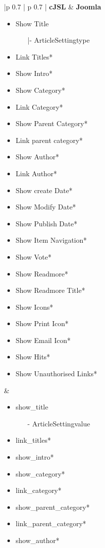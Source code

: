 \begin{minipage}{0.7\textwidth}
\begin{tabular}{|p {0.7\textwidth} | p {0.7\textwidth} |}
\hline
\textbf{cJSL} & \textbf{Joomla} \\ 
\hline
\begin{itemize}
\item Show Title
	\begin{enumerate}
	\item[|-]ArticleSettingtype
	\end{enumerate}
\item Link Titles*
\item Show Intro*
\item Show Category*
\item Link Category*
\item Show Parent Category*
\item Link parent category*
\item Show Author*
\item Link Author*
\item Show create Date*
\item Show Modify Date*
\item Show Publish Date*
\item Show Item Navigation*
\item Show Vote*
\item Show Readmore*
\item Show Readmore Title*
\item Show Icons*
\item Show Print Icon*
\item Show Email Icon*
\item Show Hits*
\item Show Unauthorised Links*
\end{itemize} 
&
\begin{itemize}
\item show\_title
	\begin{enumerate}
     \item[-]ArticleSettingvalue
	\end{enumerate}	
\item link\_titles*
\item show\_intro*
\item show\_category*
\item link\_category*
\item show\_parent\_category*
\item link\_parent\_category*
\item show\_author*

\end{itemize}
\end{tabular}
\end{minipage}
